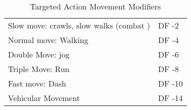 \begin{table}
	\begin{tabular}{ll}
	Slow move: crawls, slow walks (combat )   & DF -2 \\
	Normal move: Walking					   & DF -4 \\
	Double Move: jog						   & DF -6 \\
	Triple Move: Run						   & DF -8 \\
	Fast move: Dash						   & DF -10\\
	Vehicular Movement						   & DF -14 \\ 
	\end{tabular}
    \caption{Targeted Action Movement Modifiers}
\end{table}
